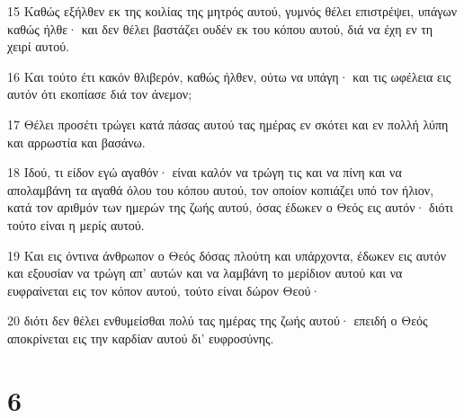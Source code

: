 \par 15 Καθώς εξήλθεν εκ της κοιλίας της μητρός αυτού, γυμνός θέλει επιστρέψει, υπάγων καθώς ήλθε· και δεν θέλει βαστάζει ουδέν εκ του κόπου αυτού, διά να έχη εν τη χειρί αυτού.
\par 16 Και τούτο έτι κακόν θλιβερόν, καθώς ήλθεν, ούτω να υπάγη· και τις ωφέλεια εις αυτόν ότι εκοπίασε διά τον άνεμον;
\par 17 Θέλει προσέτι τρώγει κατά πάσας αυτού τας ημέρας εν σκότει και εν πολλή λύπη και αρρωστία και βασάνω.
\par 18 Ιδού, τι είδον εγώ αγαθόν· είναι καλόν να τρώγη τις και να πίνη και να απολαμβάνη τα αγαθά όλου του κόπου αυτού, τον οποίον κοπιάζει υπό τον ήλιον, κατά τον αριθμόν των ημερών της ζωής αυτού, όσας έδωκεν ο Θεός εις αυτόν· διότι τούτο είναι η μερίς αυτού.
\par 19 Και εις όντινα άνθρωπον ο Θεός δόσας πλούτη και υπάρχοντα, έδωκεν εις αυτόν και εξουσίαν να τρώγη απ' αυτών και να λαμβάνη το μερίδιον αυτού και να ευφραίνεται εις τον κόπον αυτού, τούτο είναι δώρον Θεού·
\par 20 διότι δεν θέλει ενθυμείσθαι πολύ τας ημέρας της ζωής αυτού· επειδή ο Θεός αποκρίνεται εις την καρδίαν αυτού δι' ευφροσύνης.

\chapter{6}

